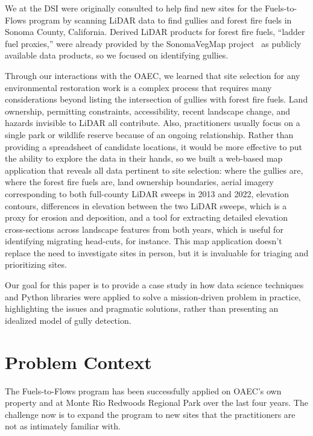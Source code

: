 We at the DSI were originally consulted to help find new sites for the Fuels-to-Flows program by scanning LiDAR data to find gullies and forest fire fuels in Sonoma County, California. Derived LiDAR products for forest fire fuels, ``ladder fuel proxies,'' were already provided by the SonomaVegMap project~\citep{SonomaVegMap} as publicly available data products, so we focused on identifying gullies.

Through our interactions with the OAEC, we learned that site selection for any environmental restoration work is a complex process that requires many considerations beyond listing the intersection of gullies with forest fire fuels. Land ownership, permitting constraints, accessibility, recent landscape change, and hazards invisible to LiDAR all contribute. Also, practitioners usually focus on a single park or wildlife reserve because of an ongoing relationship. Rather than providing a spreadsheet of candidate locations, it would be more effective to put the ability to explore the data in their hands, so we built a web-based map application that reveals all data pertinent to site selection: where the gullies are, where the forest fire fuels are, land ownership boundaries, aerial imagery corresponding to both full-county LiDAR sweeps in 2013 and 2022, elevation contours, differences in elevation between the two LiDAR sweeps, which is a proxy for erosion and deposition, and a tool for extracting detailed elevation cross-sections across landscape features from both years, which is useful for identifying migrating head-cuts, for instance. This map application doesn't replace the need to investigate sites in person, but it is invaluable for triaging and prioritizing sites.

Our goal for this paper is to provide a case study in how data science techniques and Python libraries were applied to solve a mission-driven problem in practice, highlighting the issues and pragmatic solutions, rather than presenting an idealized model of gully detection.

\section{Problem Context}

The Fuels-to-Flows program has been successfully applied on OAEC's own property and at Monte Rio Redwoods Regional Park over the last four years. The challenge now is to expand the program to new sites that the practitioners are not as intimately familiar with.

